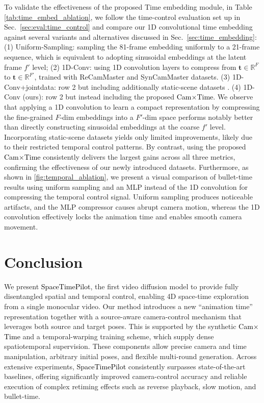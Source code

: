 \documentclass[10pt,twocolumn,letterpaper]{article}
\newcommand{\nameCOLOR}[1]{\textcolor{black}{#1}}
\newcommand{\nameMethod}{\nameCOLOR{\mbox{SpaceTimePilot}}\xspace}
\newcommand{\nameDataset}{\nameCOLOR{\mbox{Cam$\times$Time}}\xspace}
\newcommand{\animatime}{\mathbf{t}}
\newcommand{\numf}{F}
\newcommand{\numflt}{F'}
\begin{document}
\label{sec:time_embedding_ablation}
To validate the effectiveness of the proposed Time embedding module, in Table \ref{tab:time_embed_ablation}, we follow the time-control evaluation set up in Sec.~\ref{sec:eval:time_control} and compare our 1D convolutional time embedding against several variants and alternatives discussed in Sec.~\ref{sec:time_embedding}:
(1) Uniform-Sampling: sampling the 81-frame embedding uniformly to a 21-frame sequence, which is equivalent to adopting sinusoidal embeddings at the latent frame $f'$ level;
(2) 1D-Conv: using 1D convolution layers to compress from $\animatime \in \mathbb{R}^F$ to $\animatime \in \mathbb{R}^{F'}$, trained with ReCamMaster and SynCamMaster datasets.
(3) 1D-Conv+jointdata: row 2 but including additionally static-scene datasets \cite{zhou2018stereo,li2019mannequin}.
(4) 1D-Conv (ours): row 2 but instead including the proposed \nameDataset.  
We observe that applying a 1D convolution to learn a compact representation by compressing the fine-grained $\numf$-dim embeddings into a $\numflt$-dim space performs notably better than directly constructing sinusoidal embeddings at the coarse $f'$ level.
Incorporating static-scene datasets yields only limited improvements, likely due to their restricted temporal control patterns.
By contrast, using the proposed \nameDataset consistently delivers the largest gains across all three metrics, confirming the effectiveness of our newly introduced datasets.
Furthermore, as shown in \cref{fig:temporal_ablation}, we present a visual comparison of bullet-time results using uniform sampling and an MLP instead of the 1D convolution for compressing the temporal control signal.
Uniform sampling produces noticeable artifacts, and the MLP compressor causes abrupt camera motion, whereas the 1D convolution effectively locks the animation time and enables smooth camera movement.















\section{Conclusion}
We present \nameMethod, the first video diffusion model to provide fully disentangled spatial and temporal control, enabling 4D space-time exploration from a single monocular video.
Our method introduces a new “animation time” representation together with a source-aware camera-control mechanism that leverages both source and target poses. This is supported by the synthetic \nameDataset and a temporal-warping training scheme, which supply dense spatiotemporal supervision.
These components allow precise camera and time manipulation, arbitrary initial poses, and flexible multi-round generation.
Across extensive experiments, \nameMethod consistently surpasses state-of-the-art baselines, offering significantly improved camera-control accuracy and reliable execution of complex retiming effects such as reverse playback, slow motion, and bullet-time. 
\end{document}
